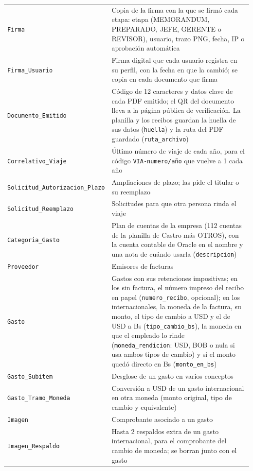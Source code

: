 \documentclass[11pt,letterpaper]{article}
\newcommand{\code}[1]{\nolinkurl{#1}}
\begin{document}
\begin{xltabular}{\textwidth}{L{4.8cm} Y}
 \code{Firma} & Copia de la firma con la que se firmó cada etapa: etapa (MEMORANDUM, PREPARADO, JEFE, GERENTE o REVISOR), usuario, trazo PNG, fecha, IP o aprobación automática \\
\code{Firma_Usuario} & Firma digital que cada usuario registra en su perfil, con la fecha en que la cambió; se copia en cada documento que firma \\
\code{Documento_Emitido} & Código de 12 caracteres y datos clave de cada PDF emitido; el QR del documento lleva a la página pública de verificación. La planilla y los recibos guardan la huella de sus datos (\code{huella}) y la ruta del PDF guardado (\code{ruta_archivo}) \\
\code{Correlativo_Viaje} & Último número de viaje de cada año, para el código \code{VIA-numero/año} que vuelve a 1 cada año \\
 \code{Solicitud_Autorizacion_Plazo} & Ampliaciones de plazo; las pide el titular o su reemplazo \\
\code{Solicitud_Reemplazo} & Solicitudes para que otra persona rinda el viaje \\
 \code{Categoria_Gasto} & Plan de cuentas de la empresa (112 cuentas de la planilla de Castro más OTROS), con la cuenta contable de Oracle en el nombre y una nota de cuándo usarla (\code{descripcion}) \\
\code{Proveedor} & Emisores de facturas \\
 \code{Gasto} & Gastos con sus retenciones impositivas; en los sin factura, el número impreso del recibo en papel (\code{numero_recibo}, opcional); en los internacionales, la moneda de la factura, su monto, el tipo de cambio a USD y el de USD a Bs (\code{tipo_cambio_bs}), la moneda en que el empleado lo rinde (\code{moneda_rendicion}: USD, BOB o nula si usa ambos tipos de cambio) y si el monto quedó directo en Bs (\code{monto_en_bs}) \\
\code{Gasto_Subitem} & Desglose de un gasto en varios conceptos \\
 \code{Gasto_Tramo_Moneda} & Conversión a USD de un gasto internacional en otra moneda (monto original, tipo de cambio y equivalente) \\
\code{Imagen} & Comprobante asociado a un gasto \\
 \code{Imagen_Respaldo} & Hasta 2 respaldos extra de un gasto internacional, para el comprobante del cambio de moneda; se borran junto con el gasto \\

\end{xltabular}
\end{document}
